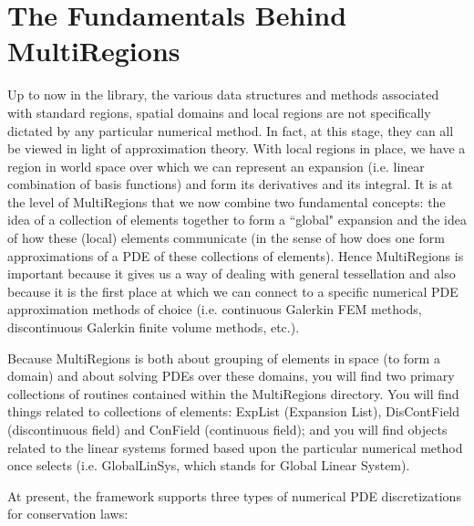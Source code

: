 %
\section{The Fundamentals Behind MultiRegions}

Up to now in the library, the various data structures and methods associated with standard regions, spatial domains and local regions are not 
specifically dictated by any particular numerical method.   In fact, at this stage, they can all be viewed in light of approximation theory.  With
local regions in place, we have a region in world space over which we can represent an expansion (i.e. linear combination of basis functions)
and form its derivatives and its integral.  It is at the level of MultiRegions that we now combine two fundamental concepts: the idea of a collection
of elements together to form a ``global" expansion and the idea of how these (local) elements communicate (in the sense of how does one form
approximations of a PDE of these collections of elements).   Hence MultiRegions is important because it gives us a way of dealing with general tessellation and
also because it is the first place at which we can connect to a specific numerical PDE approximation methods of choice (i.e. continuous Galerkin FEM methods,
discontinuous Galerkin finite volume methods, etc.).

Because MultiRegions is both about grouping of elements in space (to form a domain) and about solving PDEs over these domains, you will find two primary
collections of routines contained within the MultiRegions directory.  You will find things related to collections of elements:  ExpList (Expansion List), DisContField (discontinuous
field) and ConField (continuous field); and you will find objects related to the linear systems formed based upon the particular numerical method once selects (i.e. GlobalLinSys, 
which stands for Global Linear System).

At present, the {\nek} framework supports three types of numerical PDE discretizations for conservation laws:

